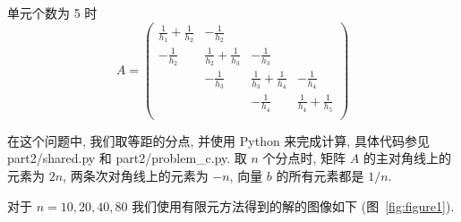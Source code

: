 \documentclass[UTF8]{article}
\begin{document}
    单元个数为 5 时
    \[
        A =
        \begin{pmatrix}
            \frac{1}{h_1}+\frac{1}{h_2} & -\frac{1}{h_2} \\
            -\frac{1}{h_2} & \frac{1}{h_2}+\frac{1}{h_3} & -\frac{1}{h_3} \\
            & -\frac{1}{h_3} & \frac{1}{h_3}+\frac{1}{h_4} & -\frac{1}{h_4}              \\
            &                & -\frac{1}{h_4}              & \frac{1}{h_4}+\frac{1}{h_5} \\
        \end{pmatrix}
    \]

    在这个问题中, 我们取等距的分点, 并使用 Python 来完成计算, 具体代码参见 part2/shared.py 和 part2/problem\_c.py.
    取 $n$ 个分点时, 矩阵 $A$ 的主对角线上的元素为 $2n$, 两条次对角线上的元素为 $-n$, 向量 $b$ 的所有元素都是 $1/n$.

    对于 $n = 10,20,40,80$ 我们使用有限元方法得到的解的图像如下 (图~\ref{fig:figure1}).
\end{document}
